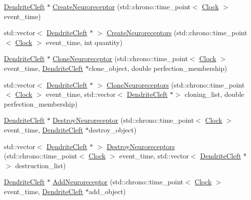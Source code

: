 \begin{DoxyCompactItemize}
\item 
\hyperlink{class_dendrite_cleft}{Dendrite\+Cleft} $\ast$ \hyperlink{class_dendrite_cleft_ac84d3e0cafecd1436c34162f687e3851}{Create\+Neuroreceptor} (std\+::chrono\+::time\+\_\+point$<$ \hyperlink{universe_8h_a0ef8d951d1ca5ab3cfaf7ab4c7a6fd80}{Clock} $>$ event\+\_\+time)
\item 
std\+::vector$<$ \hyperlink{class_dendrite_cleft}{Dendrite\+Cleft} $\ast$ $>$ \hyperlink{class_dendrite_cleft_ab34af5363b25c6498aee429725a1c7db}{Create\+Neuroreceptors} (std\+::chrono\+::time\+\_\+point$<$ \hyperlink{universe_8h_a0ef8d951d1ca5ab3cfaf7ab4c7a6fd80}{Clock} $>$ event\+\_\+time, int quantity)
\item 
\hyperlink{class_dendrite_cleft}{Dendrite\+Cleft} $\ast$ \hyperlink{class_dendrite_cleft_a7650e1115baab30729da0b03a48da851}{Clone\+Neuroreceptor} (std\+::chrono\+::time\+\_\+point$<$ \hyperlink{universe_8h_a0ef8d951d1ca5ab3cfaf7ab4c7a6fd80}{Clock} $>$ event\+\_\+time, \hyperlink{class_dendrite_cleft}{Dendrite\+Cleft} $\ast$clone\+\_\+object, double perfection\+\_\+membership)
\item 
std\+::vector$<$ \hyperlink{class_dendrite_cleft}{Dendrite\+Cleft} $\ast$ $>$ \hyperlink{class_dendrite_cleft_a93b542418482f3732380e33346e23bd2}{Clone\+Neuroreceptors} (std\+::chrono\+::time\+\_\+point$<$ \hyperlink{universe_8h_a0ef8d951d1ca5ab3cfaf7ab4c7a6fd80}{Clock} $>$ event\+\_\+time, std\+::vector$<$ \hyperlink{class_dendrite_cleft}{Dendrite\+Cleft} $\ast$$>$ cloning\+\_\+list, double perfection\+\_\+membership)
\item 
\hyperlink{class_dendrite_cleft}{Dendrite\+Cleft} $\ast$ \hyperlink{class_dendrite_cleft_a86e9943d9d140c2a06d7e222812c9548}{Destroy\+Neuroreceptor} (std\+::chrono\+::time\+\_\+point$<$ \hyperlink{universe_8h_a0ef8d951d1ca5ab3cfaf7ab4c7a6fd80}{Clock} $>$ event\+\_\+time, \hyperlink{class_dendrite_cleft}{Dendrite\+Cleft} $\ast$destroy\+\_\+object)
\item 
std\+::vector$<$ \hyperlink{class_dendrite_cleft}{Dendrite\+Cleft} $\ast$ $>$ \hyperlink{class_dendrite_cleft_a630e00e2d1108f2a43bcac9466e4681b}{Destroy\+Neuroreceptors} (std\+::chrono\+::time\+\_\+point$<$ \hyperlink{universe_8h_a0ef8d951d1ca5ab3cfaf7ab4c7a6fd80}{Clock} $>$ event\+\_\+time, std\+::vector$<$ \hyperlink{class_dendrite_cleft}{Dendrite\+Cleft} $\ast$$>$ destruction\+\_\+list)
\item 
\hyperlink{class_dendrite_cleft}{Dendrite\+Cleft} $\ast$ \hyperlink{class_dendrite_cleft_a65901c5659ca5eac161a26f15e0f437b}{Add\+Neuroreceptor} (std\+::chrono\+::time\+\_\+point$<$ \hyperlink{universe_8h_a0ef8d951d1ca5ab3cfaf7ab4c7a6fd80}{Clock} $>$ event\+\_\+time, \hyperlink{class_dendrite_cleft}{Dendrite\+Cleft} $\ast$add\+\_\+object)

\end{DoxyCompactItemize}
